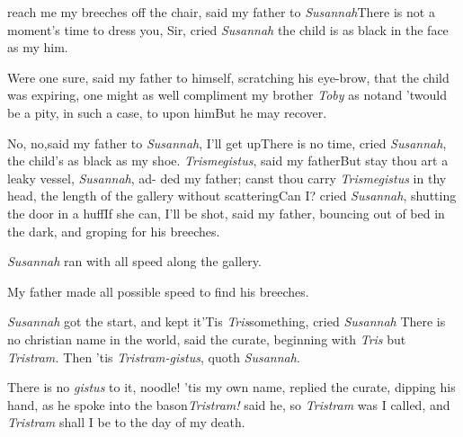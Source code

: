 \documentclass{article}
\begin{document}
 reach me my breeches\break 
off the chair, said my father to\break
\textit{Susannah}\tsh There is not a moment’s\break
time to dress you, Sir, cried \textit{Susannah}\tsk\break
the child is as black in the face as my\tsh{} 
\break
him.

Were one sure, said my father to himself, scratching his
eye-brow, that the child was expiring, one might as well compliment
my brother \textit{Toby} as not\tsk\break and ’twould be a pity, in
such a case, to\break{} upon him\tsk But he may
recover.

No, no,\tsk said my father to \textit{Susannah},\break
I’ll get up\tsk There is no time, cried\break
\textit{Susannah}, the child’s as black as my shoe.\break
\textit{Trismegistus}, said my father\tsk But stay\break
\tsh thou art a leaky vessel, \textit{Susannah}, ad-\break
ded my father; canst thou carry \textit{Trisme\-gistus} in thy head, the
length of the gal\-lery without scattering\tsk Can I? cried\break
\textit{Susannah}, shutting the door in a huff\tsk\break If she
can, I’ll be shot, said my father, bouncing out of bed in the
dark, and groping for his breeches.

\textit{Susannah} ran with all speed along the gallery.

My father made all possible speed to find his breeches.

\textit{Susannah} got the start, and kept it\tsk ’Tis
\textit{Tris}\tsk something, cried \textit{Susannah}\tsk{}
There is no christian name in the world, said the curate, beginning with
\textit{Tris}\tsk\break
but \textit{Tristram.} Then ’tis
\textit{Tristram-gistus}, quoth \textit{Susannah}.

\tsk There is no \textit{gistus} to it, noodle!\tsk\break
’tis my own name, replied the curate,
dipping his hand, as he spoke into the\break
bason\tsk \textit{Tristram!} said he, \etc \etc \etc
\etc so \textit{Tristram} was I called, and \textit{Tristram}
shall I be to the day of my death.
\end{document}
